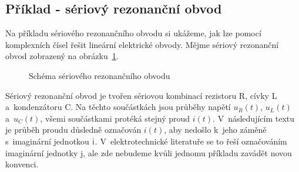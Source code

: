 \subsection{Příklad - sériový rezonanční obvod}

Na příkladu sériového rezonančního obvodu si ukážeme, jak lze pomocí komplexních čísel řešit lineární elektrické obvody. Mějme sériový rezonanční obvod zobrazený na obrázku~\ref{img:serial_resonance}.

\begin{figure}[ht]
\begin{center}
\caption{Schéma sériového rezonančního obvodu}
\label{img:serial_resonance}
\end{center}
\end{figure}

Sériový rezonanční obvod je tvořen sériovou kombinací rezistoru R, cívky L a~kondenzátoru C. Na těchto součástkách jsou průběhy napětí \(u_R(t)\), \(u_L(t)\) a~\(u_C(t)\), všemi součástkami protéká stejný proud \(i(t)\). V~následujícím textu je průběh proudu důsledně označován \(i(t)\), aby nedošlo k~jeho záměně s~imaginární jednotkou \(\mathrm{i}\). V~elektrotechnické literatuře se to řeší označováním imaginární jednotky \(\mathrm{j}\), ale zde nebudeme kvůli jednomu příkladu zavádět novou konvenci. 

